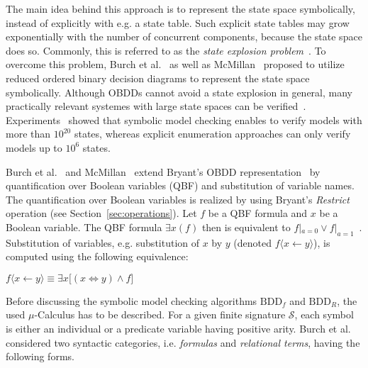 \documentclass{vldb}
\begin{document}
The main idea behind this approach is to represent the state space symbolically,
instead of explicitly with e.g. a state table. Such explicit state tables may grow
exponentially with the number of concurrent components, because the state space
does so. Commonly, this is referred to as the
\textit{state explosion problem}~\cite{BURCH90, MCMILLAN92}. To overcome this
problem, Burch et al.~\cite{BURCH90} as well as McMillan~\cite{MCMILLAN92}
proposed to utilize reduced ordered binary decision diagrams to represent the 
state space symbolically. Although OBDDs cannot avoid a state explosion in general,
many practically relevant systemes with large state spaces can be
verified~\cite{BURCH90, MCMILLAN92}. Experiments~\cite{BURCH90} showed that
symbolic model checking enables to verify models with more than $10^{20}$ states,
whereas explicit enumeration approaches can only verify models up to $10^6$
states. 

Burch et al.~\cite{BURCH90} and McMillan~\cite{MCMILLAN92} extend Bryant's OBDD
representation~\cite{BRYANT86} by quantification over Boolean variables (QBF) and
substitution of variable names. The quantification over Boolean variables is
realized by using Bryant's \textit{Restrict} operation (see
Section~\ref{sec:operations}). Let $f$ be a QBF formula and $x$ be a Boolean
variable. The QBF formula $\exists x\left(f\right)$ then is equivalent to
$f|_{a=0} \lor f|_{a=1}$~\cite{BURCH90}. Substitution of variables, e.g.
substitution of $x$ by $y$ (denoted $f\langle x\leftarrow y\rangle$), is computed
using the following equivalence:
\begin{center}
$
f\langle x\leftarrow y\rangle \equiv
\exists x\lbrack\left(x \Leftrightarrow y\right) \land f\rbrack
$
\end{center}

Before discussing the symbolic model checking algorithms $\text{BDD}_f$ and
$\text{BDD}_R$, the used $\mu$-Calculus has to be described. For a given finite
signature $\mathcal{S}$, each symbol is either an individual or a predicate
variable having positive arity. Burch et al.~\cite{BURCH90} considered two
syntactic categories, i.e. \textit{formulas} and \textit{relational terms}, having
the following forms.
\end{document}

